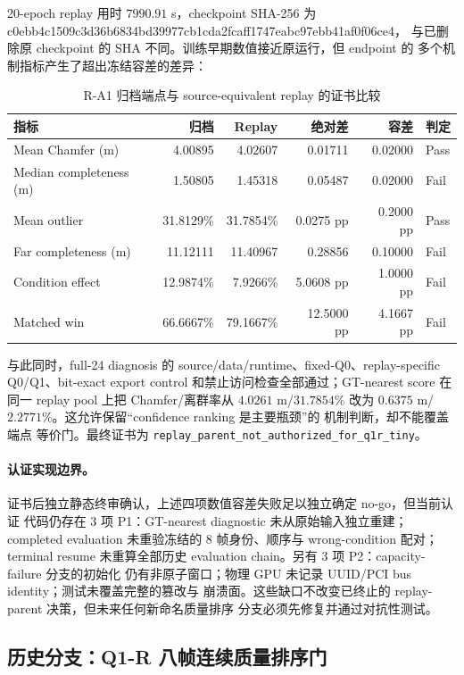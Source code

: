 \documentclass[11pt,a4paper,fontset=none]{ctexart}
\newcommand{\code}[1]{\texttt{#1}}
\newcommand{\hash}[2]{{\small\ttfamily #1\allowbreak{}#2}}
\begin{document}
20-epoch replay 用时 $7990.91$ s，checkpoint SHA-256 为
\hash{c0ebb4c1509c3d36b6834bd39977cb1c}{da2fcaff1747eabc97ebb41af0f06ce4}，
与已删除原 checkpoint 的 SHA 不同。训练早期数值接近原运行，但 endpoint 的
多个机制指标产生了超出冻结容差的差异：
\begin{table}[H]
\centering
\small
\caption{R-A1 归档端点与 source-equivalent replay 的证书比较}
\begin{tabular}{lrrrrl}
\toprule
指标 & 归档 & Replay & 绝对差 & 容差 & 判定 \\
\midrule
Mean Chamfer (m) & 4.00895 & 4.02607 & 0.01711 & 0.02000 & Pass \\
Median completeness (m) & 1.50805 & 1.45318 & 0.05487 & 0.02000 & Fail \\
Mean outlier & 31.8129\% & 31.7854\% & 0.0275 pp & 0.2000 pp & Pass \\
Far completeness (m) & 11.12111 & 11.40967 & 0.28856 & 0.10000 & Fail \\
Condition effect & 12.9874\% & 7.9266\% & 5.0608 pp & 1.0000 pp & Fail \\
Matched win & 66.6667\% & 79.1667\% & 12.5000 pp & 4.1667 pp & Fail \\
\bottomrule
\end{tabular}
\end{table}

与此同时，full-24 diagnosis 的 source/data/runtime、fixed-Q0、replay-specific
Q0/Q1、bit-exact export control 和禁止访问检查全部通过；GT-nearest score
在同一 replay pool 上把 Chamfer/离群率从 $4.0261$ m/$31.7854\%$ 改为
$0.6375$ m/$2.2771\%$。这允许保留“confidence ranking 是主要瓶颈”的
机制判断，却不能覆盖端点
等价门。最终证书为
\code{replay\_parent\_not\_authorized\_for\_q1r\_tiny}。

\paragraph{认证实现边界。}
证书后独立静态终审确认，上述四项数值容差失败足以独立确定 no-go，但当前认证
代码仍存在 3 项 P1：GT-nearest diagnostic 未从原始输入独立重建；completed
evaluation 未重验冻结的 8 帧身份、顺序与 wrong-condition 配对；terminal resume
未重算全部历史 evaluation chain。另有 3 项 P2：capacity-failure 分支的初始化
仍有非原子窗口；物理 GPU 未记录 UUID/PCI bus identity；测试未覆盖完整的篡改与
崩溃面。这些缺口不改变已终止的 replay-parent 决策，但未来任何新命名质量排序
分支必须先修复并通过对抗性测试。

\subsection{历史分支：Q1-R 八帧连续质量排序门}
\end{document}
